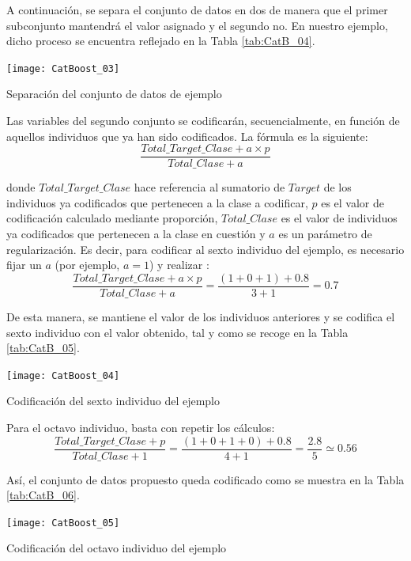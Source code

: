 \documentclass[12pt,twoside]{article}
\begin{document}
A continuación, se separa el conjunto de datos en dos de manera que el primer subconjunto mantendrá el valor asignado y el segundo no. En nuestro ejemplo, dicho proceso se encuentra reflejado en la Tabla \ref{tab:CatB_04}.
\begin{table}[h]
\centering
\texttt{[image: CatBoost\_03]}
\caption{Separación del conjunto de datos de ejemplo}
\label{tab:CatB_04}
\end{table}

\newpage
Las variables del segundo conjunto se codificarán, secuencialmente, en función de aquellos individuos que ya han sido codificados. La fórmula es la siguiente:
\begin{equation*}
\frac{Total\_Target\_Clase + a\times p}{Total\_Clase + a}
\end{equation*}

\noindent
donde $Total\_Target\_Clase$ hace referencia al sumatorio de $Target$ de los individuos ya codificados que pertenecen a la clase a codificar, $p$ es el valor de codificación calculado mediante proporción, $Total\_Clase$ es el valor de individuos ya codificados que pertenecen a la clase en cuestión y $a$ es un parámetro de regularización. Es decir, para codificar al sexto individuo del ejemplo, es necesario fijar un $a$ (por ejemplo, $a=1$) y realizar :
\begin{equation*}
\frac{Total\_Target\_Clase + a \times p}{Total\_Clase + a} = \frac{(1 + 0 + 1) + 0.8}{3 + 1} = 0.7
\end{equation*}

De esta manera, se mantiene el valor de los individuos anteriores y se codifica el sexto individuo con el valor obtenido, tal y como se recoge en la Tabla \ref{tab:CatB_05}.
\begin{table}[H]
\centering
\texttt{[image: CatBoost\_04]}
\caption{Codificación del sexto individuo del ejemplo}
\label{tab:CatB_05}
\end{table}

Para el octavo individuo, basta con repetir los cálculos:
\begin{equation*}
\frac{Total\_Target\_Clase + p}{Total\_Clase + 1} = \frac{(1 + 0 + 1 + 0) + 0.8}{4 + 1} = \frac{2.8}{5} \simeq 0.56
\end{equation*}

Así, el conjunto de datos propuesto queda codificado como se muestra en la Tabla \ref{tab:CatB_06}.
\begin{table}[h]
\centering
\texttt{[image: CatBoost\_05]}
\caption{Codificación del octavo individuo del ejemplo}
\label{tab:CatB_06}
\end{table}
\end{document}
